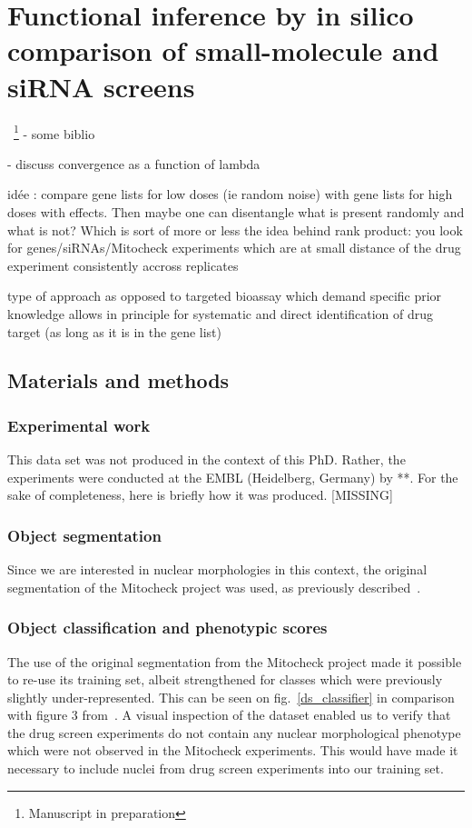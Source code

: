 \section{Functional inference by in silico comparison of small-molecule and siRNA screens}
~\footnote{Manuscript in preparation}
- some biblio ~\cite{pmid20418956}

- discuss convergence as a function of lambda

idée : compare gene lists for low doses (ie random noise) with gene lists for high doses with effects. Then maybe one can disentangle what is present randomly and what is not? Which is sort of more or less the idea behind rank product: you look for genes/siRNAs/Mitocheck experiments which are at small distance of the drug experiment consistently accross replicates

type of approach as opposed to targeted bioassay which demand specific prior knowledge allows in principle for systematic and direct identification of drug target (as long as it is in the gene list)

\subsection{Materials and methods}
\subsubsection{Experimental work}
This data set was not produced in the context of this PhD. Rather, the experiments were conducted at the EMBL (Heidelberg, Germany) by **. For the sake of completeness, here is briefly how it was produced. [MISSING]
\subsubsection{Object segmentation}
\label{sec:ds_seg}
Since we are interested in nuclear morphologies in this context, the original segmentation of the Mitocheck project was used, as previously described~\cite{Walter2010}.

\subsubsection{Object classification and phenotypic scores}
\label{sec:ps}
The use of the original segmentation from the Mitocheck project made it possible to re-use its training set, albeit strengthened for classes which were previously slightly under-represented. This can be seen on fig.~\ref{ds_classifier} in comparison with figure 3 from~\cite{Walter2010}. A visual inspection of the dataset enabled us to verify that the drug screen experiments do not contain any nuclear morphological phenotype which were not observed in the Mitocheck experiments. This would have made it necessary to include nuclei from drug screen experiments into our training set.

